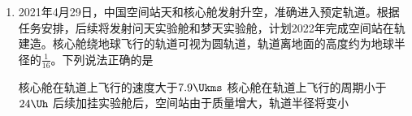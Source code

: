\documentclass[\gkver]{gaokaozhenti}
\begin{document}
\begin{enumerate}
{	$R_{\text{等}}=\frac{U_{1}}{I_{1}}=\frac{\frac{n_{1}}{n_{2}}U_{2}}{\frac{n_{2}}{n_{1}}I_{2}}=\left(\frac{n_{1}}{n_{2}}\right)^{2}\frac{U_{2}}{I_{2}}=\left(\frac{n_{1}}{n_{2}}\right)^{2}R_{2}$

	则等效电阻先增大后减小，由欧姆定律有

	$I_{1}=\frac{U}{R_{0}+R_{\text{等}}}$，$I_{2}=\frac{n_{1}}{n_{2}}I_{1}$

	$I_{1}$先减小后增大，$I_{2}$先减小后增大，则$L_{1}$先变暗后变亮，根据

	$U_{1}=U-I_{1}R_{0}$，$U_{2}=\frac{n_{2}}{n_{1}}U_{1}$

	由于$I_{1}$先减小后增大，则副线圈的电压$U_{2}$先增大后减小，通过$L_{2}$的电流为

	$I_{L2}=\frac{U_{2}}{R_{0}+R_{pb}}$

	则滑动变阻器$R$的滑片从$a$端滑到$b$端过程中，$R_{pb}$逐渐减小，副线圈的电压$U_{2}$增大过程中$I_{L2}$增大；在副线圈的电压$U_{2}$减小过程中，通过$R_{0}$的电流为

	$I_{R_{0}}=\frac{U_{2}}{R_{0}+R_{ap}}$

	$R_{ap}$逐渐增大，则$I_{R_{0}}$越来越小，则

	$I_{L2}\uparrow = I_{2}\uparrow - I_{R_{0}}\downarrow$

	则$L_{1}$先变暗后变亮，$L_{2}$一直变亮；

	故选 A。
}

\item
2021年4月29日，中国空间站天和核心舱发射升空，准确进入预定轨道。根据任务安排，后续将发射问天实验舱和梦天实验舱，计划2022年完成空间站在轨建造。核心舱绕地球飞行的轨道可视为圆轨道，轨道离地面的高度约为地球半径的$\frac{1}{16}$。下列说法正确的是 

{核心舱在轨道上飞行的速度大于$7.9 \Ukms$}
{核心舱在轨道上飞行的周期小于$24 \Uh$}
{后续加挂实验舱后，空间站由于质量增大，轨道半径将变小}

\end{enumerate}
\end{document}
